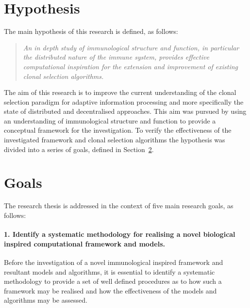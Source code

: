 %
% 
\section{Hypothesis}
\label{sec:intro:hypothesis}
The main hypothesis of this research is defined, as follows:

\begin{quote}
	\emph{An in depth study of immunological structure and function, in particular the distributed nature of the immune system, provides effective computational inspiration for the extension and improvement of existing clonal selection algorithms.}
	
\end{quote}

The aim of this research is to improve the current understanding of the clonal selection paradigm for adaptive information processing and more specifically the state of distributed and decentralised approaches. This aim was pursued by using an understanding of immunological structure and function to provide a conceptual framework for the investigation. To verify the effectiveness of the investigated framework and clonal selection algorithms the hypothesis was divided into a series of goals, defined in Section~\ref{sec:intro:goals}.

%
%
\section{Goals}
\label{sec:intro:goals}
The research thesis is addressed in the context of five main research goals, as follows:

%
%
\paragraph{1. Identify a systematic methodology for realising a novel biological inspired computational framework and models.}
Before the investigation of a novel immunological inspired framework and resultant models and algorithms, it is essential to identify a systematic methodology to provide a set of well defined procedures as to how such a framework may be realised and how the effectiveness of the models and algorithms may be assessed.

